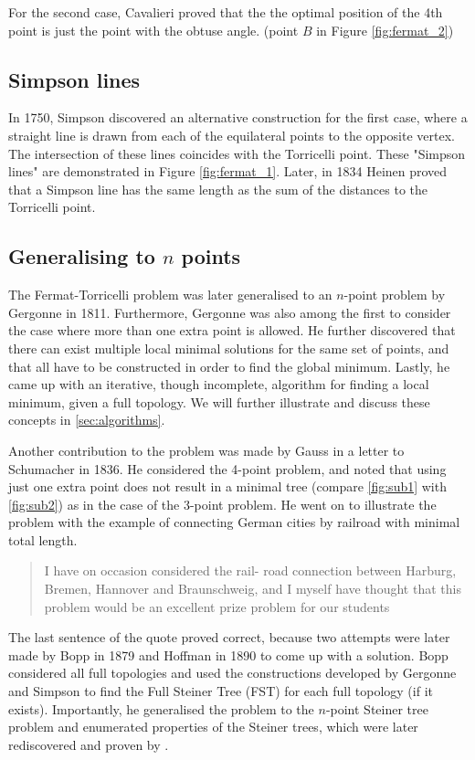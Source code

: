 \documentclass{l4proj}
\begin{document}
For the second case, Cavalieri proved that the the optimal position of the 4th point is just the point with the obtuse angle. (point $B$ in Figure \ref{fig:fermat_2})

\subsection{Simpson lines}
In 1750, Simpson discovered an alternative construction for the first case, where a straight line is drawn from each of the equilateral points to the opposite vertex. The intersection of these lines coincides with the Torricelli point. These "Simpson lines" are demonstrated in Figure \ref{fig:fermat_1}.
Later, in 1834 Heinen proved that a Simpson line has the same length as the sum of the distances to the Torricelli point.

\subsection{Generalising to $n$ points}
\label{sec:gergonne}
The Fermat-Torricelli problem was later generalised to an $n$-point problem by Gergonne in 1811. Furthermore, Gergonne was also among the first to consider the case where more than one extra point is allowed. He further discovered that there can exist multiple local minimal solutions for the same set of points, and that all have to be constructed in order to find the global minimum. Lastly, he came up with an iterative, though incomplete, algorithm for finding a local minimum, given a full topology. We will further illustrate and discuss these concepts in \ref{sec:algorithms}.

Another contribution to the problem was made by Gauss in a letter to Schumacher in 1836. He considered the 4-point problem, and noted that using just one extra point does not result in a minimal tree (compare \ref{fig:sub1} with \ref{fig:sub2}) as in the case of the 3-point problem. He went on to illustrate the problem with the example of connecting German cities by railroad with minimal total length.
\begin{quote}
    I have on occasion considered the rail- road connection between Harburg, Bremen, Hannover and Braunschweig, and I myself have thought that this problem would be an excellent prize problem for our students
\end{quote}

The last sentence of the quote proved correct, because two attempts were later made by Bopp in 1879 and Hoffman in 1890 to come up with a solution. Bopp considered all full topologies and used the constructions developed by Gergonne and Simpson to find the Full Steiner Tree (FST) for each full topology (if it exists). Importantly, he generalised the problem to the $n$-point Steiner tree problem and enumerated properties of the Steiner trees, which were later rediscovered and proven by \cite{Gilbert1968SteinerMT}.
\end{document}
